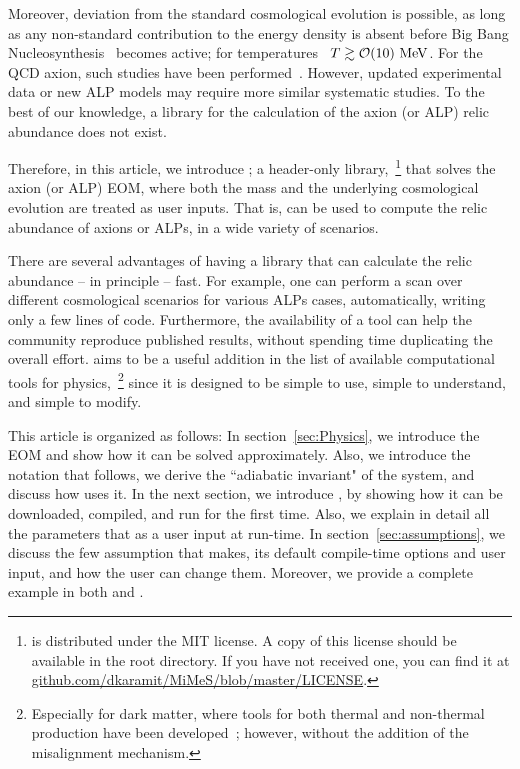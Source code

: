 \documentclass[11pt,a4paper]{article}
\begin{document}
Moreover, deviation from the standard cosmological evolution is possible, as long as any non-standard contribution to the energy density is absent before Big Bang Nucleosynthesis~\cite{Kolb:206230,Peebles:1993} becomes active; for temperatures~\cite{Kawasaki:2000en, Hannestad:2004px, Ichikawa:2005vw, DeBernardis:2008zz} $T\gtrsim \mathcal{O}(10)~{\rm MeV}$. For the QCD axion, such studies have been performed~\cite{Visinelli:2009kt, Arias:2021rer}. However, updated experimental data or new ALP models may require more similar systematic studies. To the best of our knowledge, a library for the calculation of the axion (or ALP) relic abundance does not exist. 

Therefore, in this article, we introduce \mimes;  a header-only \CPP library,~\footnote{\mimes is distributed under the MIT license. A copy of this license should be available in the \mimes root directory. If you have not received one, you can find it at  \href{https://github.com/dkaramit/MiMeS/blob/master/LICENSE}{github.com/dkaramit/MiMeS/blob/master/LICENSE}.} that solves the axion (or ALP) EOM, where both the mass and the underlying cosmological evolution are treated as user inputs. That is, \mimes can be used to compute the relic abundance of axions or ALPs, in a wide variety of scenarios.

There are several advantages of having a library that can calculate the relic abundance -- in principle -- fast. For example, one can perform a scan over different cosmological scenarios for various ALPs cases, automatically, writing only a few lines of code. Furthermore, the availability of a tool can help the community reproduce published results, without spending time duplicating the overall effort. \mimes aims to be a useful addition in the list of available computational tools for physics,~\footnote{Especially for dark matter, where tools for both thermal and non-thermal production have been developed~\cite{Gondolo:2004sc,Belanger:2013oya,Belanger:2018ccd,Binder:2021bmg}; however, without the addition of the misalignment mechanism.} since it is designed to be simple to use, simple to understand, and simple to modify.

This article is organized as follows: 
%
In section~\ref{sec:Physics}, we introduce the EOM and show how it can be solved approximately. Also, we introduce the notation that \mimes follows, we derive the ``adiabatic invariant" of the system, and discuss how \mimes uses it. 
%
In the next section, we introduce \mimes,
 by showing how it can be downloaded, compiled, and run for the first time. Also, we explain in detail all the parameters that \mimes as a user input at run-time.
%
In section~\ref{sec:assumptions}, we discuss the few assumption that \mimes makes, its default compile-time options and user input, and how the user can change them. Moreover, we provide a complete example in both \CPP and \PY. 
\end{document}
